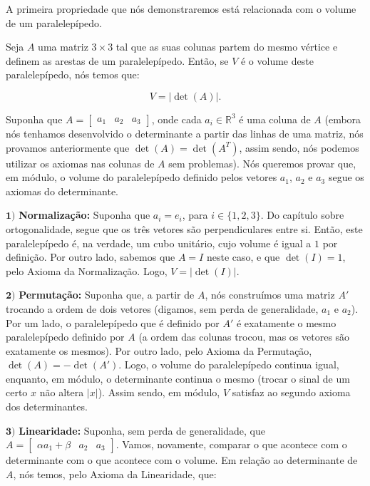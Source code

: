 A primeira propriedade que nós demonstraremos está relacionada com o volume de um paralelepípedo.

\begin{Proposition}
	Seja $A$ uma matriz $3\times 3$ tal que as suas colunas partem do mesmo vértice e definem as arestas de um paralelepípedo. Então, se $V$ é o volume deste paralelepípedo, nós temos que:
	
	$$
	V = |\det(A)|.
	$$
\end{Proposition}

\begin{Proof}
	Suponha que $A = \begin{bmatrix}
		a_1 & a_2 & a_3
	\end{bmatrix}$, onde cada $a_i\in\mathbb{R}^3$ é uma coluna de $A$ (embora nós tenhamos desenvolvido o determinante a partir das linhas de uma matriz, nós provamos anteriormente que $\det(A) = \det(A^T)$, assim sendo, nós podemos utilizar os axiomas nas colunas de $A$ sem problemas). Nós queremos provar que, em módulo, o volume do paralelepípedo definido pelos vetores $a_1$, $a_2$ e $a_3$ segue os axiomas do determinante.
	
	$\mathbf{1)}$ \textbf{Normalização:} Suponha que $a_i = e_i$, para $i\in\{1, 2, 3\}$. Do capítulo sobre ortogonalidade, segue que os três vetores são perpendiculares entre si. Então, este paralelepípedo é, na verdade, um cubo unitário, cujo volume é igual a $1$ por definição. Por outro lado, sabemos que $A = I$ neste caso, e que $\det(I) = 1$, pelo Axioma da Normalização. Logo, $V = |\det(I)|$.
	
	$\mathbf{2)}$ \textbf{Permutação:} Suponha que, a partir de $A$, nós construímos uma matriz $A'$ trocando a ordem de dois vetores (digamos, sem perda de generalidade, $a_1$ e $a_2$). Por um lado, o paralelepípedo que é definido por $A'$ é exatamente o mesmo paralelepípedo definido por $A$ (a ordem das colunas trocou, mas os vetores são exatamente os mesmos). Por outro lado, pelo Axioma da Permutação, $\det(A) = -\det(A')$. Logo, o volume do paralelepípedo continua igual, enquanto, em módulo, o determinante continua o mesmo (trocar o sinal de um certo $x$ não altera $|x|$). Assim sendo, em módulo, $V$ satisfaz ao segundo axioma dos determinantes.
	
	$\mathbf{3)}$ \textbf{Linearidade:} Suponha, sem perda de generalidade, que $A = \begin{bmatrix}
		\alpha a_1 + \beta & a_2 & a_3
 	\end{bmatrix}$. Vamos, novamente, comparar o que acontece com o determinante com o que acontece com o volume. Em relação ao determinante de $A$, nós temos, pelo Axioma da Linearidade, que:
 	

\end{Proof}
